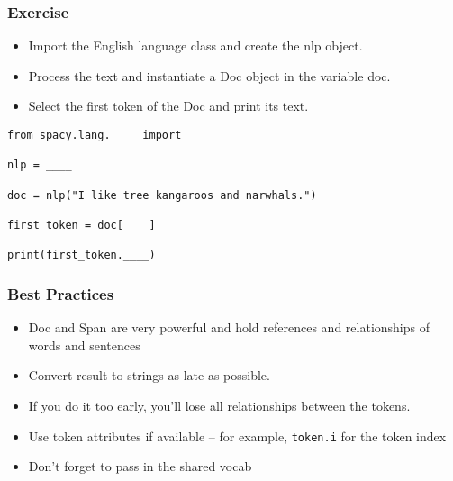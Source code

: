 \begin{frame}[fragile]\frametitle{Exercise}

  \begin{itemize}
    \item Import the English language class and create the nlp object.
    \item Process the text and instantiate a Doc object in the variable doc.
    \item Select the first token of the Doc and print its text.
  \end{itemize}

  \begin{lstlisting}
from spacy.lang.____ import ____

nlp = ____

doc = nlp("I like tree kangaroos and narwhals.")

first_token = doc[____]

print(first_token.____)
  \end{lstlisting}
	
\end{frame}

\begin{frame}[fragile]\frametitle{Best Practices}

  \begin{itemize}
    \item Doc and Span are very powerful and hold references and relationships of words and sentences
    \item Convert result to strings as late as possible. 
		\item If you do it too early, you'll lose all relationships between the tokens.
    \item Use token attributes if available – for example, \lstinline|token.i|  for the token index
    \item Don't forget to pass in the shared vocab
  \end{itemize}

\end{frame}



